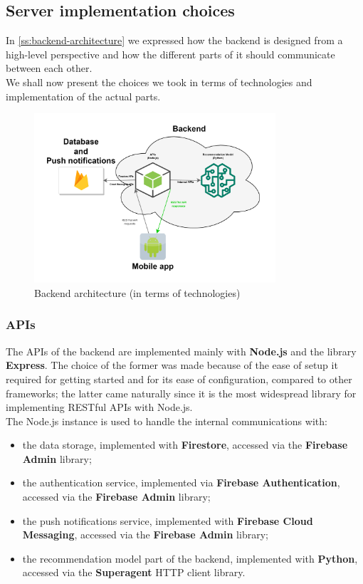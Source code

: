 \documentclass[../../main]{subfiles}
\begin{document}
\subsection{Server implementation choices}
\label{ss:server-implementation-choices}

In \ref{ss:backend-architecture} we expressed how the backend is designed from a high-level perspective and how the different parts of it should communicate between each other.\\
We shall now present the choices we took in terms of technologies and implementation of the actual parts.

\begin{figure}[h]
    \centering
    \includegraphics[width=0.8\textwidth]{images/backend_architecture_technologies}
    \caption{Backend architecture (in terms of technologies)}\label{fig:backend_architecture_technologies}
\end{figure}

\subsubsection{APIs}
\label{sss:apis}

The APIs of the backend are implemented mainly with \textbf{Node.js} and the library \textbf{Express}.
The choice of the former was made because of the ease of setup it required for getting started and for its ease of configuration, compared to other frameworks;
the latter came naturally since it is the most widespread library for implementing RESTful APIs with Node.js.\\
The Node.js instance is used to handle the internal communications with:
\begin{itemize}
    \item the data storage, implemented with \textbf{Firestore}, accessed via the \textbf{Firebase Admin} library;
    \item the authentication service, implemented via \textbf{Firebase Authentication}, accessed via the \textbf{Firebase Admin} library;
    \item the push notifications service, implemented with \textbf{Firebase Cloud Messaging}, accessed via the \textbf{Firebase Admin} library;
    \item the recommendation model part of the backend, implemented with \textbf{Python}, accessed via the \textbf{Superagent} HTTP client library.
\end{itemize}
\end{document}
